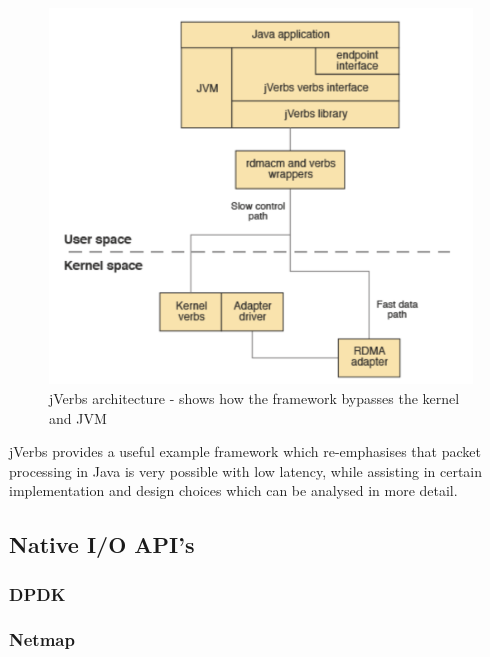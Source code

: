 \documentclass[interim_report.tex]{subfiles}
\begin{document}
\begin{figure}[H]
	\centering
	\includegraphics[width=\textwidth]{img/jverbs.png}
	\caption{jVerbs architecture - shows how the framework bypasses the kernel and JVM \cite{ibm_jverbs}}
	\label{fig:jverb}
\end{figure}

jVerbs provides a useful example framework which re-emphasises that packet processing in Java is very possible with low latency, while assisting in certain implementation and design choices which can be analysed in more detail. 

\subsection{Native I/O API's}


\subsubsection{DPDK}
\subsubsection{Netmap}
\end{document}
